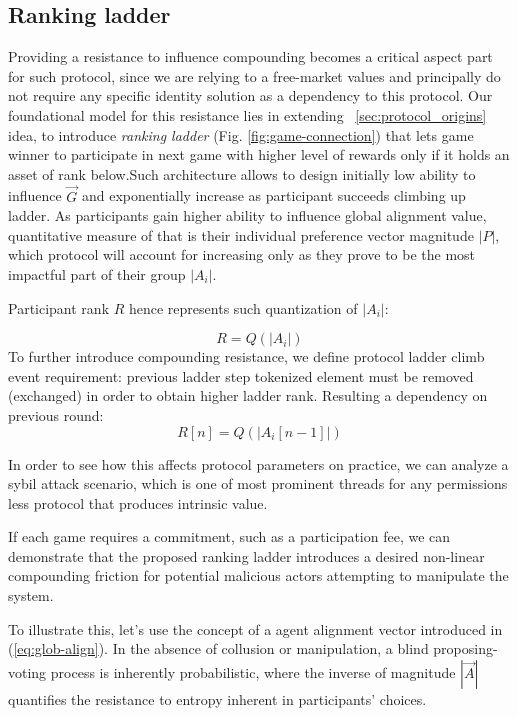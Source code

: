 \documentclass{article}
\begin{document}
\begin{CJK}{UTF8}{gbsn}
\begin{multicols}{2}
        \subsection{Ranking ladder}

        Providing a resistance to influence compounding becomes a critical aspect part for such protocol, since we are relying to a free-market values and principally do not require any specific identity solution as a dependency to this protocol.
        Our foundational model for this resistance lies in extending  ~\ref{sec:protocol_origins} idea, to introduce \textit{ranking ladder} (Fig. \ref*{fig:game-connection}) that lets game winner to participate in next game with higher level of rewards only if it holds an asset of rank below.Such architecture allows to design initially low ability to influence ${\vec{G}}$ and exponentially increase as participant succeeds climbing up ladder. As participants gain higher ability to influence global alignment value, quantitative measure of that is their individual preference vector magnitude $|P|$, which protocol will account for increasing only as they prove to be the most impactful part of their group $|A_i|$.
        
        Participant rank $R$ hence represents such quantization of $|A_i|$:

        \begin{equation}
            R = Q(|A_i|)
        \end{equation}
        To further introduce compounding resistance, we define protocol ladder climb event requirement: previous ladder step tokenized element must be removed (exchanged) in order to obtain higher ladder rank. Resulting a dependency on previous round:
        \begin{equation}
            R[n] = Q(|A_i[n-1]|)
        \end{equation}

        In order to see how this affects protocol parameters on practice, we can analyze a sybil attack scenario, which is one of most prominent threads for any permissions less protocol that produces intrinsic value.


        If each game requires a commitment, such as a participation fee, we can demonstrate that the proposed ranking ladder introduces a desired non-linear compounding friction for potential malicious actors attempting to manipulate the system.

        To illustrate this, let's use the concept of a agent alignment vector introduced in (\ref*{eq:glob-align}). In the absence of collusion or manipulation, a blind proposing-voting process is inherently probabilistic, where the inverse of magnitude $|\vec{A}|$ quantifies the resistance to entropy inherent in participants' choices.



\end{multicols}
\end{CJK}
\end{document}
